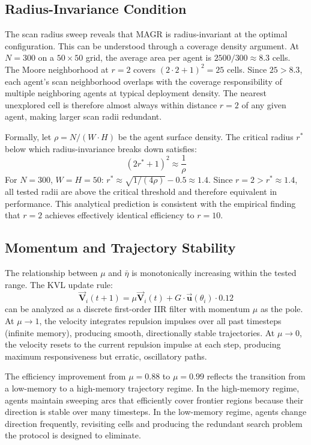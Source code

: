 \documentclass[journal,compsoc]{IEEEtran}
\newcommand{\vecc}[1]{\vec{\mathbf{#1}}}
\begin{document}
\subsection{Radius-Invariance Condition}

The scan radius sweep reveals that MAGR is radius-invariant at the optimal
configuration. This can be understood through a coverage density argument. At
$N=300$ on a $50\times50$ grid, the average area per agent is
$2500/300 \approx 8.3$ cells. The Moore neighborhood at $r=2$ covers
$(2\cdot2+1)^2 = 25$ cells. Since $25 > 8.3$, each agent's scan neighborhood
overlaps with the coverage responsibility of multiple neighboring agents at
typical deployment density. The nearest unexplored cell is therefore almost
always within distance $r=2$ of any given agent, making larger scan radii
redundant.

Formally, let $\rho = N / (W \cdot H)$ be the agent surface density. The critical
radius $r^*$ below which radius-invariance breaks down satisfies:
\begin{equation}
    (2r^*+1)^2 \approx \frac{1}{\rho}
    \label{eq:rcrit}
\end{equation}
For $N=300$, $W=H=50$: $r^* \approx \sqrt{1/(4\rho)} - 0.5 \approx 1.4$.
Since $r=2 > r^* \approx 1.4$, all tested radii are above the critical threshold
and therefore equivalent in performance. This analytical prediction is consistent
with the empirical finding that $r=2$ achieves effectively identical efficiency to
$r=10$.

\subsection{Momentum and Trajectory Stability}

The relationship between $\mu$ and $\bar{\eta}$ is monotonically increasing within
the tested range. The KVL update rule:
\begin{equation}
    \vecc{V}_{i}(t+1) = \mu \vecc{V}_{i}(t) + G\cdot\vecc{u}(\theta_i)\cdot 0.12
\end{equation}
can be analyzed as a discrete first-order IIR filter with momentum $\mu$ as the
pole. At $\mu\to 1$, the velocity integrates repulsion impulses over all past
timesteps (infinite memory), producing smooth, directionally stable trajectories.
At $\mu\to 0$, the velocity resets to the current repulsion impulse at each step,
producing maximum responsiveness but erratic, oscillatory paths.

The efficiency improvement from $\mu=0.88$ to $\mu=0.99$ reflects the transition
from a low-memory to a high-memory trajectory regime. In the high-memory regime,
agents maintain sweeping arcs that efficiently cover frontier regions because their
direction is stable over many timesteps. In the low-memory regime, agents change
direction frequently, revisiting cells and producing the redundant search problem
the protocol is designed to eliminate.
\end{document}
